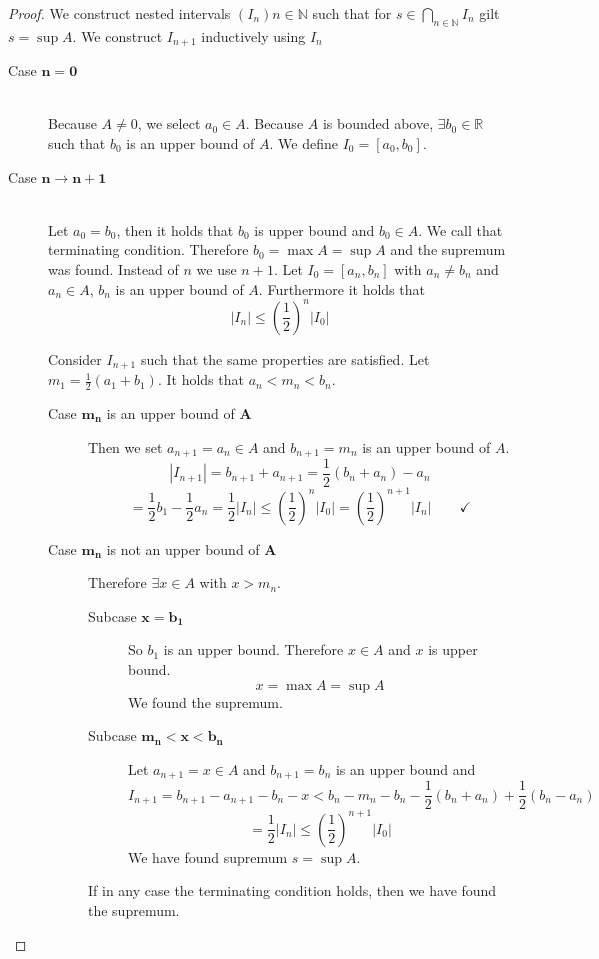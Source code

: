 \documentclass[a4paper,landscape,twocolumn]{article}
\newcommand\abs[1]{\left|#1\right|}
\begin{document}
\begin{proof}
  We construct nested intervals $(I_n){{n \in \mathbb N}}$ such that
  for $s \in \bigcap_{n \in \mathbb N} I_n$ gilt $s = \sup{A}$.
  We construct $I_{n+1}$ inductively using $I_n$

  \begin{description}
    \item[Case $\mathbf{n = 0}$] \hfill{} \\
      Because $A \neq 0$, we select $a_0 \in A$.
      Because $A$ is bounded above, $\exists b_0 \in \mathbb R$
      such that $b_0$ is an upper bound of $A$.
      We define $I_0 = [a_0, b_0]$.
    \item[Case $\mathbf{n \rightarrow n + 1}$] \hfill{} \\
      Let $a_0 = b_0$, then it holds that $b_0$ is upper bound and $b_0 \in A$.
      We call that terminating condition.
      Therefore $b_0 = \max{A} = \sup{A}$ and the supremum was found.
      Instead of $n$ we use $n + 1$.
      Let $I_0 = [a_n, b_n]$ with $a_n \neq b_n$ and $a_n \in A$,
      $b_n$ is an upper bound of $A$. Furthermore it holds that
      \[ \abs{I_n} \leq \left(\frac12\right)^n \abs{I_0} \]

      Consider $I_{n+1}$ such that the same properties are satisfied.
      Let $m_1 = \frac12 (a_1 + b_1)$. It holds that $a_n < m_n < b_n$.

      \begin{description}
        \item[Case $\mathbf{m_n}$ is an upper bound of $\mathbf{A}$]
          Then we set $a_{n+1} = a_n \in A$ and
          $b_{n+1} = m_n$ is an upper bound of $A$.
          \[ \abs{I_{n+1}} = b_{n+1} + a_{n+1} = \frac12 (b_n + a_n) - a_n \]
          \[
            = \frac12 b_1 - \frac12 a_n = \frac12 \abs{I_n}
            \leq \left(\frac12\right)^n \abs{I_0}
            = \left(\frac12\right)^{n+1} \abs{I_n}
            \qquad \checkmark
          \]
        \item[Case $\mathbf{m_n}$ is not an upper bound of $\mathbf{A}$]
          Therefore $\exists x \in A$ with $x > m_n$.
          \begin{description}
            \item[Subcase $\mathbf{x = b_1}$]
              So $b_1$ is an upper bound.
              Therefore $x \in A$ and $x$ is upper bound.
              \[ x = \max{A} = \sup{A} \]
              We found the supremum.
            \item[Subcase $\mathbf{m_n < x < b_n}$]
              Let $a_{n+1} = x \in A$ and $b_{n + 1} = b_n$ is an upper bound
              and
              \[
                  I_{n + 1} = b_{n+1} - a_{n+1} - b_n - x
                  < b_n - m_n - b_n - \frac12 (b_n + a_n) + \frac12 (b_n - a_n)
              \] \[
                  = \frac12 \abs{I_n} \leq \left(\frac12\right)^{n+1} \abs{I_0}
              \]
              We have found supremum $s = \sup{A}$.
          \end{description}
          If in any case the terminating condition holds, then we have found
          the supremum.


\end{description}
\end{description}
\end{proof}
\end{document}
